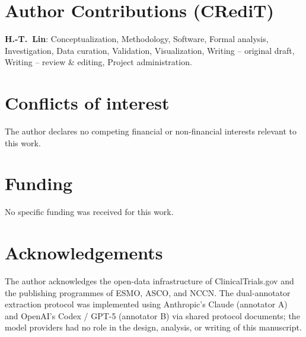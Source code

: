 \documentclass[11pt,a4paper]{article}
\begin{document}
\section*{Author Contributions (CRediT)}
\textbf{H.-T.\ Lin}: Conceptualization, Methodology, Software, Formal analysis, Investigation, Data curation, Validation, Visualization, Writing -- original draft, Writing -- review \& editing, Project administration.

\section*{Conflicts of interest}
The author declares no competing financial or non-financial interests relevant to this work.

\section*{Funding}
No specific funding was received for this work.

\section*{Acknowledgements}
The author acknowledges the open-data infrastructure of ClinicalTrials.gov and the publishing programmes of ESMO, ASCO, and NCCN. The dual-annotator extraction protocol was implemented using Anthropic's Claude (annotator A) and OpenAI's Codex / GPT-5 (annotator B) via shared protocol documents; the model providers had no role in the design, analysis, or writing of this manuscript.



\end{document}
